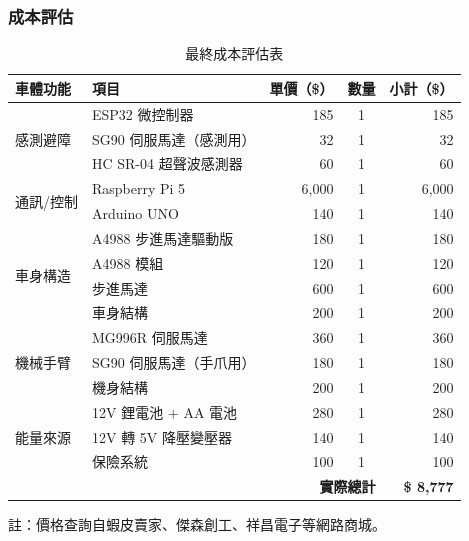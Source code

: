 \documentclass[12pt]{article}
\begin{document}
\subsubsection{成本評估}

\begin{table}[H]
  \centering
  \caption{最終成本評估表}
  \label{tab:costs}
  \scriptsize
  \setlength{\tabcolsep}{3pt}
  \renewcommand{\arraystretch}{0.95}
  \begin{tabularx}{\linewidth}{l X r c r}
    \toprule
    車體功能 & 項目 & 單價（\$） & 數量 & 小計（\$）\\
    \midrule
    \multirow{3}{*}{感測避障}
      & ESP32 微控制器               & 185   & 1 & 185 \\
      & SG90 伺服馬達（感測用）        & 32    & 1 & 32 \\
      & HC SR-04 超聲波感測器         & 60    & 1 & 60 \\
    \midrule
    \multirow{2}{*}{通訊/控制}
      & Raspberry Pi 5              & 6{,}000 & 1 & 6{,}000 \\
      & Arduino UNO                 & 140   & 1 & 140 \\
    \midrule
    \multirow{4}{*}{車身構造}
      & A4988 步進馬達驅動版           & 180   & 1 & 180 \\
      & A4988 模組                   & 120   & 1 & 120 \\
      & 步進馬達                     & 600   & 1 & 600 \\
      & 車身結構                     & 200   & 1 & 200 \\
    \midrule
    \multirow{3}{*}{機械手臂}
      & MG996R 伺服馬達              & 360   & 1 & 360 \\
      & SG90 伺服馬達（手爪用）        & 180   & 1 & 180 \\
      & 機身結構                     & 200   & 1 & 200 \\
    \midrule
    \multirow{3}{*}{能量來源}
      & 12V 鋰電池 + AA 電池         & 280   & 1 & 280 \\
      & 12V 轉 5V 降壓變壓器         & 140   & 1 & 140 \\
      & 保險系統                     & 100   & 1 & 100 \\
    \midrule
    \multicolumn{4}{r}{\textbf{實際總計}} & \textbf{\$ 8{,}777}\\
    \bottomrule
  \end{tabularx}
  \par\vspace{4pt}
  \begin{flushleft}
    \footnotesize 註：價格查詢自蝦皮賣家、傑森創工、祥昌電子等網路商城。
  \end{flushleft}
\end{table}
\end{document}
